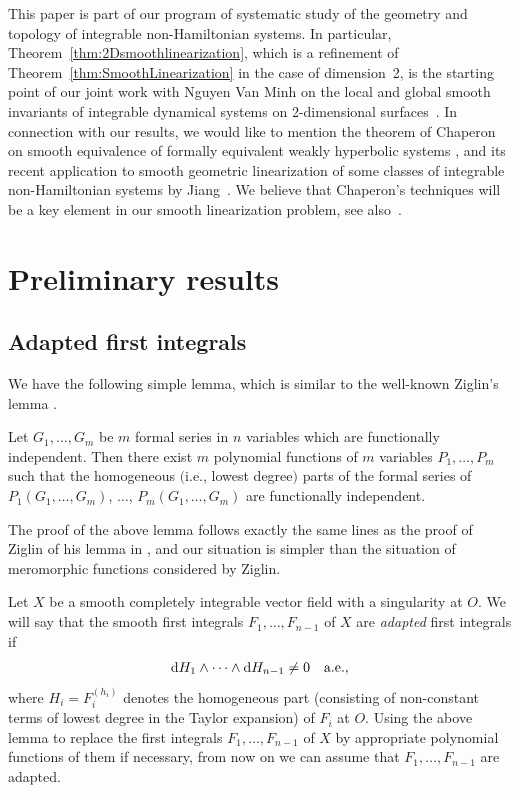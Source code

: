 This paper is part of our program of systematic study of the geometry and topology
of integrable non-Hamiltonian systems. In particular, Theorem~\ref{thm:2Dsmoothlinearization},
which is a ref\/inement of Theo\-rem~\ref{thm:SmoothLinearization} in the case of dimension~2,
is the starting point of our joint work with Nguyen Van Minh on the
local and global smooth invariants of integrable dynamical
systems on 2-dimensional surfaces~\cite{ZungMinh_2D2012}. In connection
with our results, we would
like to mention the theorem of Cha\-pe\-ron on smooth equivalence of formally equivalent weakly
hyperbolic systems \cite{Chaperon-WeakHyperbolic2013}, and its recent application to smooth
geometric linearization of some classes of integrable non-Hamiltonian
systems by Jiang~\cite{Jiang-WeakHyp2016}. We believe that Chaperon's techniques will be
a key element in our smooth linearization problem, see also~\cite{Zung-Integrable2016}.

\section{Preliminary results}\label{section2}

\subsection{Adapted f\/irst integrals}\label{subsection:adapted}

We have the following simple lemma, which is similar to
the well-known Ziglin's lemma \cite{Ziglin-Branching1982}.

\begin{lem}
 Let $G_1,\dots,G_m$ be $m$ formal series in $n$ variables which are functionally independent. Then
there exist $m$ polynomial functions of $m$ variables $P_1,\dots, P_m$ such that the homogeneous
$($i.e., lowest degree$)$ parts of the formal series of $P_1(G_1,\dots,G_m)$, $\dots$, $P_m(G_1,\dots,G_m)$ are functionally independent.
\end{lem}

The proof of the above lemma follows exactly the same lines as the proof of Ziglin of his lemma in
\cite{Ziglin-Branching1982}, and our situation is simpler than the situation of meromorphic
functions considered by Ziglin.

Let $X$ be a smooth completely integrable vector f\/ield with a singularity at $O$.
We will say that the smooth f\/irst integrals $F_1, \dots, F_{n-1}$ of $X$
are \emph{adapted} f\/irst integrals if
\begin{gather*}
 {\rm d}H_1 \wedge \dots \wedge {\rm d}H_{n-1} \neq 0 \quad \text{a.e.},
\end{gather*}
where $H_i = F_i^{(h_i)}$ denotes the homogeneous part (consisting of non-constant terms of lowest degree in the Taylor
expansion) of $F_i$ at $O$.
Using the above lemma to replace the f\/irst integrals $F_1, \dots, F_{n-1}$ of $X$ by appropriate
polynomial functions of them if necessary, from now on we can assume that $F_1,\dots, F_{n-1}$ are adapted.

